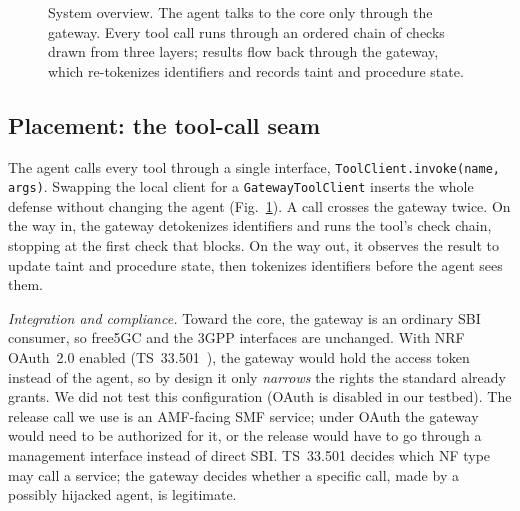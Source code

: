 \documentclass[conference]{IEEEtran}
\newcommand{\code}[1]{\texttt{\small #1}}
\begin{document}
\begin{figure}[t]
\caption{System overview. The agent talks to the core only through the gateway. Every tool
call runs through an ordered chain of checks drawn from three layers; results flow back
through the gateway, which re-tokenizes identifiers and records taint and procedure state.}
\label{fig:arch}
\end{figure}

\subsection{Placement: the tool-call seam}
\label{sec:placement}
The agent calls every tool through a single interface,
\code{ToolClient.invoke(name, args)}. Swapping the local client for a
\code{GatewayToolClient} inserts the whole defense without changing the agent (Fig.~\ref{fig:arch}). A call crosses the gateway twice. On the
way in, the gateway detokenizes identifiers and runs the tool's check chain, stopping at the
first check that blocks. On the way out, it observes the result to update taint and
procedure state, then tokenizes identifiers before the agent sees them.

\textit{Integration and compliance.} Toward the core, the gateway is an ordinary SBI
consumer, so free5GC and the 3GPP interfaces are unchanged. With NRF OAuth~2.0 enabled
(TS~33.501~\cite{ts33501}), the gateway would hold the access token instead of the agent, so
by design it only \emph{narrows} the rights the standard already grants. We did not test this
configuration (OAuth is disabled in our testbed). The release call we use is
an AMF-facing SMF service; under OAuth the gateway would need to be authorized for it, or the
release would have to go through a management interface instead of direct SBI.
TS~33.501 decides which NF type may call a service; the gateway decides whether a specific
call, made by a possibly hijacked agent, is legitimate.
\end{document}
